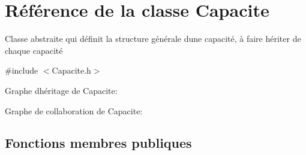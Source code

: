 \hypertarget{class_capacite}{}\section{Référence de la classe Capacite}
\label{class_capacite}


Classe abstraite qui définit la structure générale d\textquotesingle{}une capacité, à faire hériter de chaque capacité  




{\ttfamily \#include $<$Capacite.\+h$>$}



Graphe d\textquotesingle{}héritage de Capacite\+:


Graphe de collaboration de Capacite\+:
\subsection*{Fonctions membres publiques}
